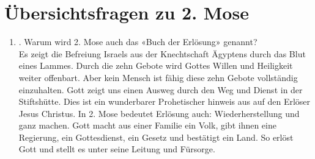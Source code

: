 \section{Übersichtsfragen zu 2. Mose}
\begin{enumerate}
    \item . Warum wird 2. Mose auch das «Buch der
    Erlösung» genannt?\\
    Es zeigt die Befreiung Israels aus der Knechtschaft Ägyptens durch das Blut eines Lammes. Durch die zehn Gebote wird Gottes Willen und Heiligkeit weiter offenbart. Aber kein Mensch ist fähig diese zehn Gebote vollständig einzuhalten. Gott zeigt uns einen Ausweg durch den Weg und Dienst in der Stiftshütte. Dies ist ein wunderbarer Prohetischer hinweis aus auf den Erlöser Jesus Christus. In 2. Mose bedeutet Erlösung auch: Wiederherstellung und ganz machen. Gott macht aus einer Familie ein Volk, gibt ihnen eine Regierung, ein Gottesdienst, ein Gesetz und bestätigt ein Land. So erlöst Gott und stellt es unter seine Leitung und Fürsorge.
\end{enumerate}